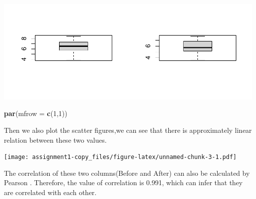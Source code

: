 \documentclass[
]{article}
\newenvironment{Shaded}{\begin{snugshade}}{\end{snugshade}}
\newcommand{\AttributeTok}[1]{\textcolor[rgb]{0.13,0.29,0.53}{#1}}
\newcommand{\CommentTok}[1]{\textcolor[rgb]{0.56,0.35,0.01}{\textit{#1}}}
\newcommand{\DecValTok}[1]{\textcolor[rgb]{0.00,0.00,0.81}{#1}}
\newcommand{\FunctionTok}[1]{\textcolor[rgb]{0.13,0.29,0.53}{\textbf{#1}}}
\newcommand{\NormalTok}[1]{#1}
\newcommand{\SpecialCharTok}[1]{\textcolor[rgb]{0.81,0.36,0.00}{\textbf{#1}}}
\newcommand{\StringTok}[1]{\textcolor[rgb]{0.31,0.60,0.02}{#1}}
\begin{document}
\includegraphics{assignment1-copy_files/figure-latex/unnamed-chunk-2-1.pdf}

\begin{Shaded}
\begin{Highlighting}[]
\FunctionTok{par}\NormalTok{(}\AttributeTok{mfrow =} \FunctionTok{c}\NormalTok{(}\DecValTok{1}\NormalTok{,}\DecValTok{1}\NormalTok{))}
\end{Highlighting}
\end{Shaded}

Then we also plot the scatter figures,we can see that there is
approximately linear relation between these two values.

\begin{Shaded}
\end{Shaded}

\texttt{[image: assignment1-copy\_files/figure-latex/unnamed-chunk-3-1.pdf]}

The correlation of these two columns(Before and After) can also be
calculated by Pearson . Therefore, the value of correlation is 0.991,
which can infer that they are correlated with each other.

\begin{Shaded}
\end{Shaded}
\end{document}
